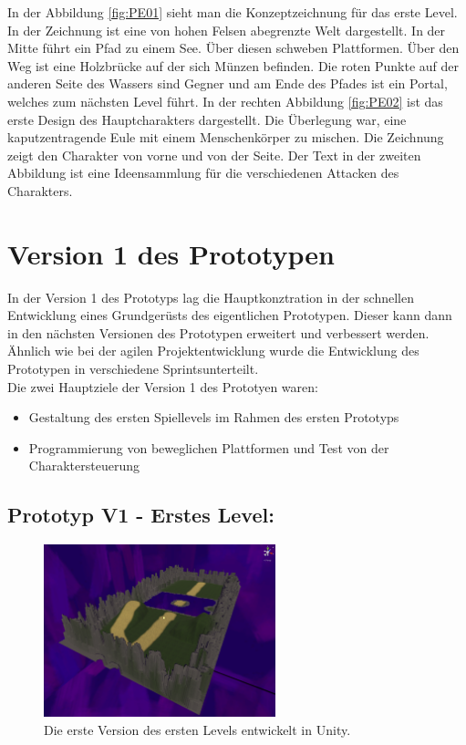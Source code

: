 In der Abbildung \ref{fig:PE01} sieht man die Konzeptzeichnung für das erste Level. In der Zeichnung ist eine von hohen Felsen abegrenzte Welt dargestellt. In der Mitte führt ein Pfad zu einem See. Über diesen schweben Plattformen. Über den Weg ist eine Holzbrücke auf der sich Münzen befinden. Die roten Punkte auf der anderen Seite des Wassers sind Gegner und am Ende des Pfades ist ein Portal, welches zum nächsten Level führt. In der rechten Abbildung \ref{fig:PE02} ist das erste Design des Hauptcharakters dargestellt. Die Überlegung war, eine kaputzentragende Eule mit einem Menschenkörper zu mischen. Die Zeichnung zeigt den Charakter von vorne und von der Seite. Der Text in der zweiten Abbildung ist eine Ideensammlung für die verschiedenen Attacken des Charakters. 
\pagebreak


\section{Version 1 des Prototypen}
In der Version 1 des Prototyps lag die Hauptkonztration in der schnellen Entwicklung eines Grundgerüsts des eigentlichen Prototypen. Dieser kann dann in den nächsten Versionen des Prototypen erweitert und verbessert werden. Ähnlich wie bei der agilen Projektentwicklung wurde die Entwicklung des Prototypen in verschiedene \glqq Sprints\grqq\space unterteilt. \\

Die zwei Hauptziele der Version 1 des Prototyen waren: 
\begin{itemize}
  \item Gestaltung des ersten Spiellevels im Rahmen des ersten Prototyps
  \item Programmierung von beweglichen Plattformen und Test von der Charaktersteuerung
\end{itemize}

\subsection{Prototyp V1 - Erstes Level:}

\begin{figure}[h]
  \centering
  \includegraphics*[width=0.6\textwidth]{chapters/04/images/V1/V1.png}
  \caption{Die erste Version des ersten Levels entwickelt in Unity.}
  \label{fig:PE03}
\end{figure}

